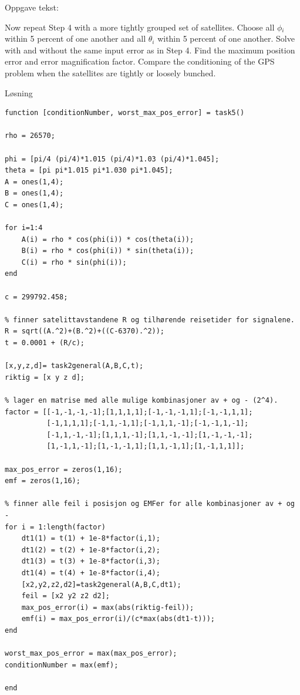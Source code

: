 % 

Oppgave tekst: 

Now repeat Step 4 with a more tightly grouped set of satellites. Choose all $\phi$$_i$ within
5 percent of one another and all $\theta$$_i$ within 5 percent of one another. Solve with and without the same input error as in Step 4. Find the maximum position error and error magnification factor. Compare the conditioning of the GPS problem when the satellites are tightly or loosely bunched.

\vspace{5mm}
Løsning

\begin{lstlisting}[caption={Task3.m}]
function [conditionNumber, worst_max_pos_error] = task5()

rho = 26570;

phi = [pi/4 (pi/4)*1.015 (pi/4)*1.03 (pi/4)*1.045];
theta = [pi pi*1.015 pi*1.030 pi*1.045];
A = ones(1,4); 
B = ones(1,4); 
C = ones(1,4);

for i=1:4
    A(i) = rho * cos(phi(i)) * cos(theta(i));
    B(i) = rho * cos(phi(i)) * sin(theta(i));
    C(i) = rho * sin(phi(i));
end

c = 299792.458;

% finner satelittavstandene R og tilhørende reisetider for signalene.
R = sqrt((A.^2)+(B.^2)+((C-6370).^2));
t = 0.0001 + (R/c);

[x,y,z,d]= task2general(A,B,C,t); 
riktig = [x y z d];

% lager en matrise med alle mulige kombinasjoner av + og - (2^4).
factor = [[-1,-1,-1,-1];[1,1,1,1];[-1,-1,-1,1];[-1,-1,1,1];
		  [-1,1,1,1];[-1,1,-1,1];[-1,1,1,-1];[-1,-1,1,-1];
		  [-1,1,-1,-1];[1,1,1,-1];[1,1,-1,-1];[1,-1,-1,-1];
		  [1,-1,1,-1];[1,-1,-1,1];[1,1,-1,1];[1,-1,1,1]];

max_pos_error = zeros(1,16);
emf = zeros(1,16);

% finner alle feil i posisjon og EMFer for alle kombinasjoner av + og -
for i = 1:length(factor)
    dt1(1) = t(1) + 1e-8*factor(i,1);
    dt1(2) = t(2) + 1e-8*factor(i,2);
    dt1(3) = t(3) + 1e-8*factor(i,3);
    dt1(4) = t(4) + 1e-8*factor(i,4); 
    [x2,y2,z2,d2]=task2general(A,B,C,dt1);
    feil = [x2 y2 z2 d2];
    max_pos_error(i) = max(abs(riktig-feil));
    emf(i) = max_pos_error(i)/(c*max(abs(dt1-t)));
end

worst_max_pos_error = max(max_pos_error);
conditionNumber = max(emf);

end
\end{lstlisting}

